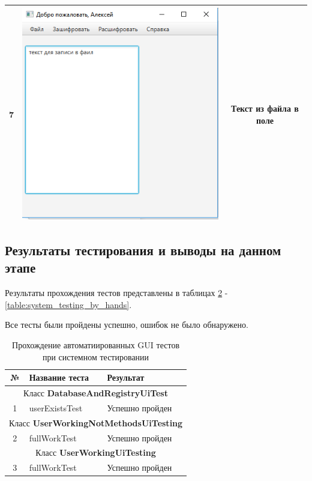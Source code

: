 \documentclass[a4paper,12pt]{article}
\begin{document}
\begin{table}[pt!]
\begin{tabular}{|c|c|c|}
	7 & \includegraphics[scale=0.3]{img/file/open/text_open4.png} & Текст из файла в поле\\
	\hline
\end{tabular} 
\label{table:data_type5} 
\end{table}

\newpage\subsection{Результаты тестирования и выводы на данном этапе}
Результаты прохождения тестов представлены в таблицах \ref{table:system_testing_gui} - \ref{table:system_testing_by_hands}.

Все тесты были пройдены успешно, ошибок не было обнаружено.

\begin{table}[h!]
	\caption{Прохождение автоматиированных GUI тестов при системном тестировании}
	\centering
	\begin{tabular}{|c|l|l|}
	\hline 
	№ &  Название теста & Результат \\ 
	\hline 
	\multicolumn{3}{|c|}{Класс \textbf{DatabaseAndRegistryUiTest}}\\
	\hline
	1 & userExistsTest & Успешно пройден  \\
	\hline 
	\multicolumn{3}{|c|}{Класс \textbf{UserWorkingNotMethodsUiTesting}}\\
	\hline
	2 &  fullWorkTest & Успешно пройден  \\
	\hline 
	\multicolumn{3}{|c|}{Класс \textbf{UserWorkingUiTesting}}\\
	\hline
	3 & fullWorkTest & Успешно пройден  \\
	\hline
\end{tabular} 
\label{table:system_testing_gui} 
\end{table}
\end{document}
